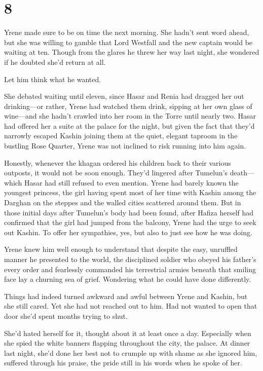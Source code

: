 
\chapter{8}

Yrene made sure to be on time the next morning. She hadn't sent word ahead, but she was willing to gamble that Lord Westfall and the new captain would be waiting at ten. Though from the glares he threw her way last night, she wondered if he doubted she'd return at all.

Let him think what he wanted.

She debated waiting until eleven, since Hasar and Renia had dragged her out drinking---or rather, Yrene had watched them drink, sipping at her own glass of wine---and she hadn't crawled into her room in the Torre until nearly two. Hasar had offered her a suite at the palace for the night, but given the fact that they'd narrowly escaped Kashin joining them at the quiet, elegant taproom in the bustling Rose Quarter, Yrene was not inclined to risk running into him again.

Honestly, whenever the khagan ordered his children back to their various outposts, it would not be soon enough. They'd lingered after Tumelun's death--- which Hasar had still refused to even mention. Yrene had barely known the youngest princess, the girl having spent most of her time with Kashin among the Darghan on the steppes and the walled cities scattered around them. But in those initial days after Tumelun's body had been found, after Hafiza herself had confirmed that the girl had jumped from the balcony, Yrene had the urge to seek out Kashin. To offer her sympathies, yes, but also to just see how he was doing.

Yrene knew him well enough to understand that despite the easy, unruffled manner he presented to the world, the disciplined soldier who obeyed his father's every order and fearlessly commanded his terrestrial armies  beneath that smiling face lay a churning sea of grief. Wondering what he could have done differently.

Things had indeed turned awkward and awful between Yrene and Kashin, but
 she still cared. Yet she had not reached out to him. Had not wanted to open that door she'd spent months trying to shut.

She'd hated herself for it, thought about it at least once a day. Especially when she spied the white banners flapping throughout the city, the palace. At dinner last night, she'd done her best not to crumple up with shame as she ignored him, suffered through his praise, the pride still in his words when he spoke of her.

